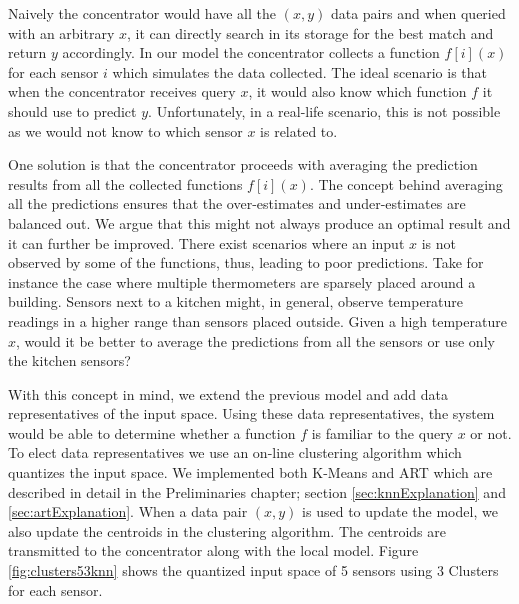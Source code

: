 \documentclass{mproj}
\begin{document}
Naively the concentrator would have all the $(x,y)$ data pairs and when queried with an arbitrary $x$, it can directly search in its storage for the best match and return $y$ accordingly. In our model the concentrator collects a function $f[i](x)$ for each sensor $i$ which simulates the data collected. The ideal scenario is that when the concentrator receives query $x$, it would also know which function $f$ it should use to predict $y$. Unfortunately, in a real-life scenario, this is not possible as we would not know to which sensor $x$ is related to.

One solution is that the concentrator proceeds with averaging the prediction results from all the collected functions $f[i](x)$. The concept behind averaging all the predictions ensures that the over-estimates and under-estimates are balanced out. We argue that this might not always produce an optimal result and it can further be improved. There exist scenarios where an input $x$ is not observed by some of the functions, thus, leading to poor predictions. Take for instance the case where multiple thermometers are sparsely placed around a building. Sensors next to a kitchen might, in general, observe temperature readings in a higher range than sensors placed outside. Given a high temperature $x$, would it be better to average the predictions from all the sensors or use only the kitchen sensors?

With this concept in mind, we extend the previous model and add data representatives of the input space. Using these data representatives, the system would be able to determine whether a function $f$ is familiar to the query $x$ or not. To elect data representatives we use an on-line clustering algorithm which quantizes the input space. We implemented both K-Means and ART which are described in detail in the Preliminaries chapter; section \ref{sec:knnExplanation} and \ref{sec:artExplanation}. When a data pair $(x,y)$ is used to update the model, we also update the centroids in the clustering algorithm. The centroids are transmitted to the concentrator along with the local model. Figure \ref{fig:clusters53knn} shows the quantized input space of 5 sensors using 3 Clusters for each sensor.
\end{document}
